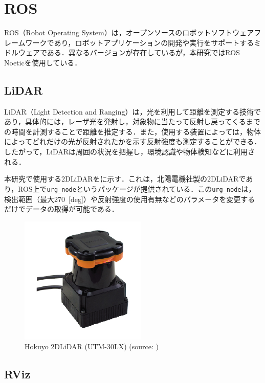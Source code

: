 
\section{ROS}

ROS（Robot Operating System）\cite{ros}は，オープンソースのロボットソフトウェアフレームワークであり，ロボットアプリケーションの開発や実行をサポートするミドルウェアである．異なるバージョンが存在しているが，本研究ではROS Noeticを使用している．

\subsection{LiDAR}

  LiDAR（Light Detection and Ranging）は，光を利用して距離を測定する技術であり，具体的には，レーザ光を発射し，対象物に当たって反射し戻ってくるまでの時間を計測することで距離を推定する．また，使用する装置によっては，物体によってどれだけの光が反射されたかを示す反射強度も測定することができる．したがって，LiDARは周囲の状況を把握し，環境認識や物体検知などに利用される．

  本研究で使用する2DLiDARをに示す．これは，北陽電機社製の2DLiDARであり，ROS上で\texttt{urg\_node}\cite{urg_node}というパッケージが提供されている．この\texttt{urg\_node}は，検出範囲（最大270 \,[deg]）や反射強度の使用有無などのパラメータを変更するだけでデータの取得が可能である．

  \begin{figure}[h]
    \centering
    \includegraphics[keepaspectratio, scale=0.80] {images/pdf/RobotGuidance_hokuyo_lidar}
    \caption[Hokuyo 2DLiDAR (UTM-30LX)]{Hokuyo 2DLiDAR (UTM-30LX) (source: \cite{hokuyo})}
    \label{Fig:hokuyo_lidar}
  \end{figure}

\newpage

\subsection{RViz}

